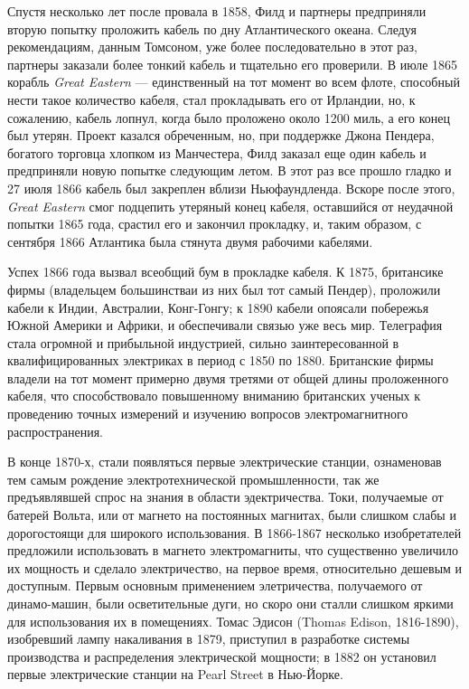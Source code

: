\documentclass[12pt, oneside, a4paper]{article}
\begin{document}
Спустя несколько лет после провала в 1858, Филд и партнеры предприняли вторую попытку проложить кабель по дну Атлантического океана. Следуя рекомендациям, данным Томсоном, уже более последовательно в этот раз, партнеры заказали более тонкий кабель и тщательно его проверили. В июле 1865 корабль \emph{Great Eastern} --- единственный на тот момент во всем флоте, способный нести такое количество кабеля, стал прокладывать его от Ирландии, но, к сожалению, кабель лопнул, когда было проложено около 1200 миль, а его конец был утерян. Проект казался обреченным, но, при поддержке Джона Пендера, богатого торговца хлопком из Манчестера, Филд заказал еще один кабель и предприняли новую попытке следующим летом. В этот раз все прошло гладко и 27 июля 1866 кабель был закреплен вблизи Ньюфаундленда. Вскоре после этого, \emph{Great Eastern} смог подцепить утеряный конец кабеля, оставшийся от неудачной попытки 1865 года, срастил его и закончил прокладку, и, таким образом, с сентября 1866 Атлантика была стянута двумя рабочими кабелями.

Успех 1866 года вызвал всеобщий бум в прокладке кабеля. К 1875, британсике фирмы (владельцем большинстваи из них был тот самый Пендер), проложили кабели к Индии, Австралии, Конг-Гонгу; к 1890 кабели опоясали побережья Южной Америки и Африки, и обеспечивали связью уже весь мир. Телеграфия стала огромной и прибыльной индустрией, сильно заинтересованной в квалифицированных электриках в период с 1850 по 1880. Британские фирмы владели на тот момент примерно двумя третями от общей длины проложенного кабеля, что способствовало повышенному вниманию британских ученых к проведению точных измерений и изучению вопросов электромагнитного распространения.

В конце 1870-х, стали появляться первые электрические станции, ознаменовав тем самым рождение электротехнической промышленности, так же предъявлявшей спрос на знания в области эдектричества. Токи, получаемые от батерей Вольта, или от магнето на постоянных магнитах, были слишком слабы и дорогостоящи для широкого использования. В 1866-1867 несколько изобретателей предложили использовать в магнето электромагниты, что существенно увеличило их мощность и сделало электричество, на первое время, относительно дешевым и доступным. Первым основным применением элетричества, получаемого от динамо-машин, были осветительные дуги, но скоро они сталли слишком яркими для использования их в помещениях. Томас Эдисон (Thomas Edison, 1816-1890), изобревший лампу накаливания в 1879, приступил в разработке системы производства и распределения электрической мощности; в 1882 он установил первые электрические станции на Pearl Street в Нью-Йорке.
\end{document}

